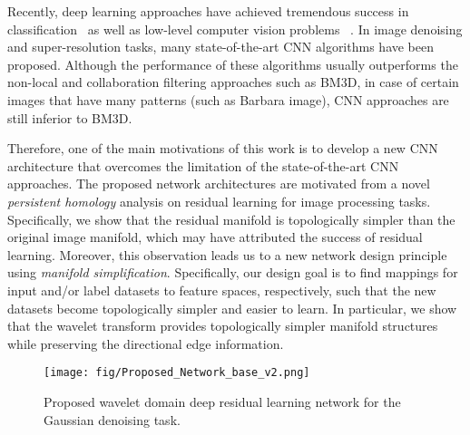 \documentclass[10pt,twocolumn,letterpaper]{article}
\begin{document}
Recently, deep learning approaches have achieved tremendous
success in classification~\cite{krizhevsky2012imagenet} as well as low-level computer vision problems ~\cite{ronneberger2015u}. 
In image denoising and super-resolution tasks, many state-of-the-art CNN algorithms \cite{chen2015trainable,chen2015learning,mao2016image,zhang2016beyond} have been proposed.
Although the performance of these algorithms usually outperforms the non-local and collaboration filtering approaches such as BM3D,
in case of certain images that have many patterns (such as Barbara image), CNN approaches are still inferior to BM3D. 


Therefore, one of the main motivations of this work is to develop a new CNN architecture that 
overcomes the limitation of the state-of-the-art CNN approaches. The proposed network architectures are motivated from a novel {\em persistent homology} analysis \cite{edelsbrunner2008persistent} on residual learning for image processing tasks. Specifically, we show that the residual manifold is 
topologically simpler than the original image manifold, which may have attributed the success of residual learning. 
Moreover, this observation leads us to a new network design principle using {\em manifold simplification}.
Specifically, our design goal is to find mappings for input and/or label datasets to feature spaces, respectively, such that
the new datasets become topologically simpler and easier to learn.
In particular, we show that the wavelet transform provides topologically simpler manifold structures while
preserving the directional edge information. 



\begin{figure*}[!hbt]
\centerline{\texttt{[image: fig/Proposed\_Network\_base\_v2.png]}}
\caption{ Proposed wavelet domain deep residual learning network for the Gaussian denoising task.} \label{fig:Proposed_Network_base}
\end{figure*}
\end{document}
